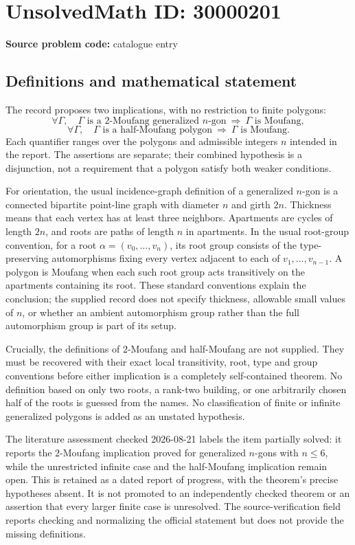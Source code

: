 \documentclass[11pt]{article}
\begin{document}
\section*{UnsolvedMath ID: 30000201}
\textbf{Source problem code:} catalogue entry
\subsection{Definitions and mathematical statement}
The record proposes two implications, with no restriction to finite polygons:
\[
 \forall\Gamma,\quad
 \Gamma\text{ is a }2\text{-Moufang generalized }n\text{-gon}
 \ \Longrightarrow\ \Gamma\text{ is Moufang},
\]
\[
 \forall\Gamma,\quad
 \Gamma\text{ is a half-Moufang polygon}
 \ \Longrightarrow\ \Gamma\text{ is Moufang}.
\]
Each quantifier ranges over the polygons and admissible integers \(n\) intended in the report. The assertions are separate; their combined hypothesis is a disjunction, not a requirement that a polygon satisfy both weaker conditions.

For orientation, the usual incidence-graph definition of a generalized \(n\)-gon is a connected bipartite point-line graph with diameter \(n\) and girth \(2n\). Thickness means that each vertex has at least three neighbors. Apartments are cycles of length \(2n\), and roots are paths of length \(n\) in apartments. In the usual root-group convention, for a root \(\alpha=(v_0,\ldots,v_n)\), its root group consists of the type-preserving automorphisms fixing every vertex adjacent to each of \(v_1,\ldots,v_{n-1}\). A polygon is Moufang when each such root group acts transitively on the apartments containing its root. These standard conventions explain the conclusion; the supplied record does not specify thickness, allowable small values of \(n\), or whether an ambient automorphism group rather than the full automorphism group is part of its setup.

Crucially, the definitions of \(2\)-Moufang and half-Moufang are not supplied. They must be recovered with their exact local transitivity, root, type and group conventions before either implication is a completely self-contained theorem. No definition based on only two roots, a rank-two building, or one arbitrarily chosen half of the roots is guessed from the names. No classification of finite or infinite generalized polygons is added as an unstated hypothesis.

The literature assessment checked 2026-08-21 labels the item partially solved: it reports the \(2\)-Moufang implication proved for generalized \(n\)-gons with \(n\leq6\), while the unrestricted infinite case and the half-Moufang implication remain open. This is retained as a dated report of progress, with the theorem's precise hypotheses absent. It is not promoted to an independently checked theorem or an assertion that every larger finite case is unresolved. The source-verification field reports checking and normalizing the official statement but does not provide the missing definitions.
\end{document}
